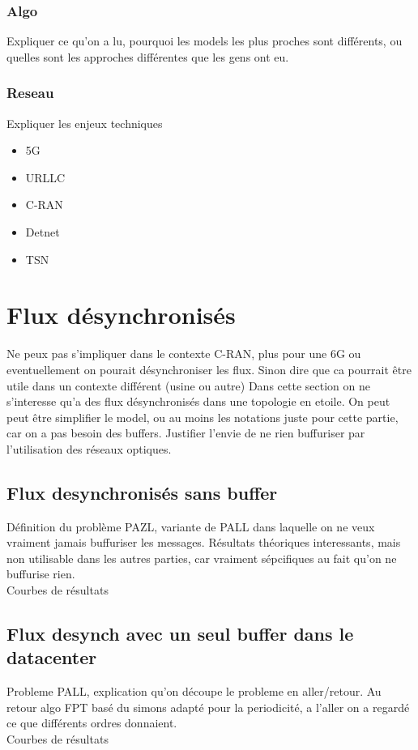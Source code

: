 \documentclass[a4paper,10pt]{article}
\begin{document}
\subsubsection{Algo}
Expliquer ce qu'on a lu, pourquoi les models les plus proches sont différents, ou quelles sont les approches différentes que les gens ont eu.
\subsubsection{Reseau}
Expliquer les enjeux techniques
\begin{itemize}
 \item 5G
 \item URLLC
 \item C-RAN
 \item Detnet
 \item TSN
\end{itemize}

\section{Flux désynchronisés}
Ne peux pas s'impliquer dans le contexte C-RAN, plus pour une 6G ou eventuellement on pourait désynchroniser les flux. Sinon dire que ca pourrait être utile dans un contexte différent (usine ou autre)
Dans cette section on ne s'interesse qu'a des flux désynchronisés dans une topologie en etoile.
On peut peut être simplifier le model, ou au moins les notations juste pour cette partie, car on a pas besoin  des buffers.
Justifier l'envie de ne rien buffuriser par l'utilisation des réseaux optiques.
\subsection{Flux desynchronisés sans buffer}
Définition du problème PAZL, variante de PALL dans laquelle on ne veux vraiment jamais buffuriser les messages.
Résultats théoriques interessants, mais non utilisable dans les autres parties, car vraiment sépcifiques au fait qu'on ne buffurise rien.\\
Courbes de résultats
\subsection{Flux desynch avec un seul buffer dans le datacenter}
Probleme PALL, explication qu'on découpe le probleme en aller/retour.
Au retour algo FPT basé du simons adapté pour la periodicité, a l'aller on a regardé ce que différents ordres donnaient.\\
Courbes de résultats
\end{document}
